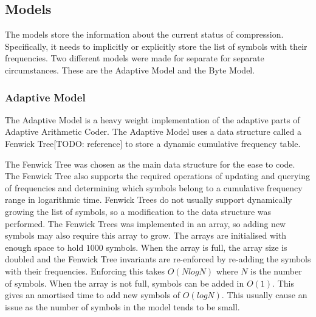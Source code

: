 \documentclass[a4paper,11pt]{report}
\begin{document}
\subsection{Models}

The models store the information about the current status of compression. Specifically, it needs to implicitly or explicitly store the list of symbols with their frequencies. Two different models were made for separate for separate circumstances. These are the Adaptive Model and the Byte Model.

\subsubsection{Adaptive Model}

The Adaptive Model is a heavy weight implementation of the adaptive parts of Adaptive Arithmetic Coder. The Adaptive Model uses a data structure called a Fenwick Tree[TODO: reference] to store a dynamic cumulative frequency table. 

The Fenwick Tree was chosen as the main data structure for the ease to code. The Fenwick Tree also supports the required operations of updating and querying of frequencies and determining which symbols belong to a cumulative frequency range in logarithmic time. Fenwick Trees do not usually support dynamically growing the list of symbols, so a modification to the data structure was performed. The Fenwick Trees was implemented in an array, so adding new symbols may also require this array to grow. The arrays are initialised with enough space to hold $1000$ symbols. When the array is full, the array size is doubled and the Fenwick Tree invariants are re-enforced by re-adding the symbols with their frequencies. Enforcing this takes $O(NlogN)$ where $N$ is the number of symbols. When the array is not full, symbols can be added in $O(1)$. This gives an amortised time to add new symbols of $O(logN)$. This usually cause an issue as the number of symbols in the model tends to be small.
\end{document}

